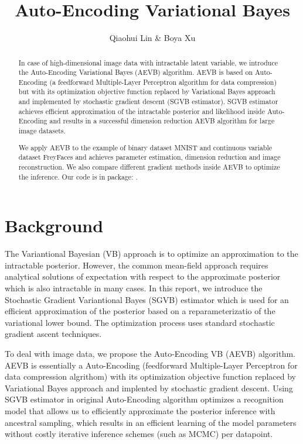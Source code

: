 \documentclass[11pt]{article}
\begin{document}
\title{Auto-Encoding Variational Bayes}
\author{Qiaohui Lin  \&  Boya Xu} 
\date{}
\maketitle


\begin{abstract}
\noindent
In case of high-dimensional image data with intractable latent variable, we introduce the Auto-Encoding Variational Bayes (AEVB) algorithm. AEVB is based on Auto-Encoding (a feedforward Multiple-Layer Perceptron algorithm for data compression) but with its optimization objective function replaced by Variational Bayes approach and implemented by stochastic gradient descent (SGVB estimator). SGVB estimator achieves efficient approximation of the intractable posterior and likelihood inside Auto-Encoding and results in a successful dimension reduction AEVB algorithm for large image datasets.
\newline

\noindent
We apply AEVB to the example of binary dataset MNIST and continuous variable dataset FreyFaces and achieves parameter estimation, dimension reduction and image reconstruction. We also compare different gradient methods inside AEVB to optimize the inference. Our code is in package: .
\end{abstract}

\vspace{5mm}

\section{Background}

The Variantional Bayesian (VB) approach is to optimize an approximation to the intractable posterior. However, the common mean-field approach requires analytical solutions of expectation with respect to the approximate posterior which is also intractable in many cases. In this report, we introduce the Stochastic Gradient Variantional Bayes (SGVB) estimator which is used for an efficient approximation of the posterior  based on a reparameterizatio of the variational lower bound. The optimization process uses standard stochastic gradient ascent techniques. 
\newline

To deal with image data, we propose the Auto-Encoding VB (AEVB) algorithm. AEVB is essentially a Auto-Encoding (feedforward Multiple-Layer Perceptron for data compression algrithom) with its optimization objective function replaced by Variational Bayes approach and implented by stochastic gradient descent. Using SGVB estimator in original Auto-Encoding algorithm optimizes a recognition model that allows us to efficiently approximate the posterior inference with ancestral sampling, which results in an efficient learning of the model parameters without costly iterative inference schemes (such as MCMC) per datapoint.
\newline
\end{document}
